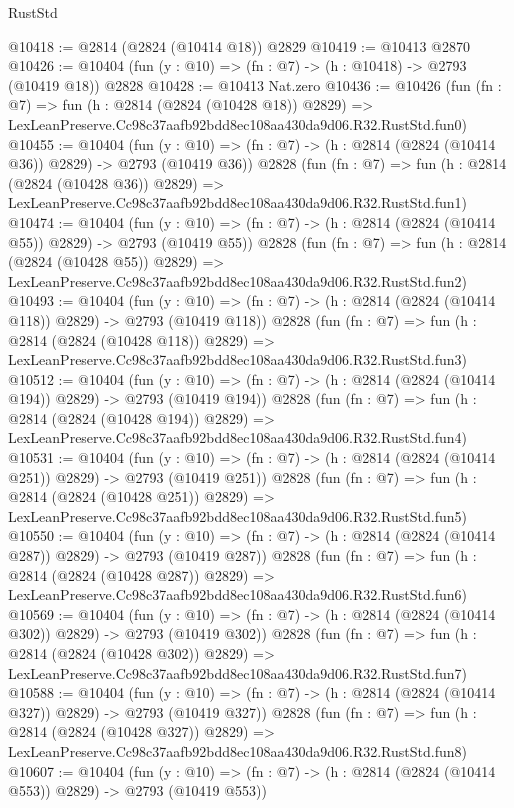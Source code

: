 \begin{lexlean}{RustStd}
\begin{coremodule}
@10418 := @2814 (@2824 (@10414 @18)) @2829
@10419 := @10413 @2870
@10426 := @10404 (fun (y : @10) => (fn : @7) -> (h : @10418) -> @2793 (@10419 @18)) @2828
@10428 := @10413 Nat.zero
@10436 := @10426
    (fun (fn : @7) =>
    fun (h : @2814 (@2824 (@10428 @18)) @2829) =>
    LexLeanPreserve.Cc98c37aafb92bdd8ec108aa430da9d06.R32.RustStd.fun0)
@10455 := @10404
    (fun (y : @10) => (fn : @7) -> (h : @2814 (@2824 (@10414 @36)) @2829) -> @2793 (@10419 @36))
    @2828
    (fun (fn : @7) =>
    fun (h : @2814 (@2824 (@10428 @36)) @2829) =>
    LexLeanPreserve.Cc98c37aafb92bdd8ec108aa430da9d06.R32.RustStd.fun1)
@10474 := @10404
    (fun (y : @10) => (fn : @7) -> (h : @2814 (@2824 (@10414 @55)) @2829) -> @2793 (@10419 @55))
    @2828
    (fun (fn : @7) =>
    fun (h : @2814 (@2824 (@10428 @55)) @2829) =>
    LexLeanPreserve.Cc98c37aafb92bdd8ec108aa430da9d06.R32.RustStd.fun2)
@10493 := @10404
    (fun (y : @10) => (fn : @7) -> (h : @2814 (@2824 (@10414 @118)) @2829) -> @2793 (@10419 @118))
    @2828
    (fun (fn : @7) =>
    fun (h : @2814 (@2824 (@10428 @118)) @2829) =>
    LexLeanPreserve.Cc98c37aafb92bdd8ec108aa430da9d06.R32.RustStd.fun3)
@10512 := @10404
    (fun (y : @10) => (fn : @7) -> (h : @2814 (@2824 (@10414 @194)) @2829) -> @2793 (@10419 @194))
    @2828
    (fun (fn : @7) =>
    fun (h : @2814 (@2824 (@10428 @194)) @2829) =>
    LexLeanPreserve.Cc98c37aafb92bdd8ec108aa430da9d06.R32.RustStd.fun4)
@10531 := @10404
    (fun (y : @10) => (fn : @7) -> (h : @2814 (@2824 (@10414 @251)) @2829) -> @2793 (@10419 @251))
    @2828
    (fun (fn : @7) =>
    fun (h : @2814 (@2824 (@10428 @251)) @2829) =>
    LexLeanPreserve.Cc98c37aafb92bdd8ec108aa430da9d06.R32.RustStd.fun5)
@10550 := @10404
    (fun (y : @10) => (fn : @7) -> (h : @2814 (@2824 (@10414 @287)) @2829) -> @2793 (@10419 @287))
    @2828
    (fun (fn : @7) =>
    fun (h : @2814 (@2824 (@10428 @287)) @2829) =>
    LexLeanPreserve.Cc98c37aafb92bdd8ec108aa430da9d06.R32.RustStd.fun6)
@10569 := @10404
    (fun (y : @10) => (fn : @7) -> (h : @2814 (@2824 (@10414 @302)) @2829) -> @2793 (@10419 @302))
    @2828
    (fun (fn : @7) =>
    fun (h : @2814 (@2824 (@10428 @302)) @2829) =>
    LexLeanPreserve.Cc98c37aafb92bdd8ec108aa430da9d06.R32.RustStd.fun7)
@10588 := @10404
    (fun (y : @10) => (fn : @7) -> (h : @2814 (@2824 (@10414 @327)) @2829) -> @2793 (@10419 @327))
    @2828
    (fun (fn : @7) =>
    fun (h : @2814 (@2824 (@10428 @327)) @2829) =>
    LexLeanPreserve.Cc98c37aafb92bdd8ec108aa430da9d06.R32.RustStd.fun8)
@10607 := @10404
    (fun (y : @10) => (fn : @7) -> (h : @2814 (@2824 (@10414 @553)) @2829) -> @2793 (@10419 @553))

\end{coremodule}
\end{lexlean}
